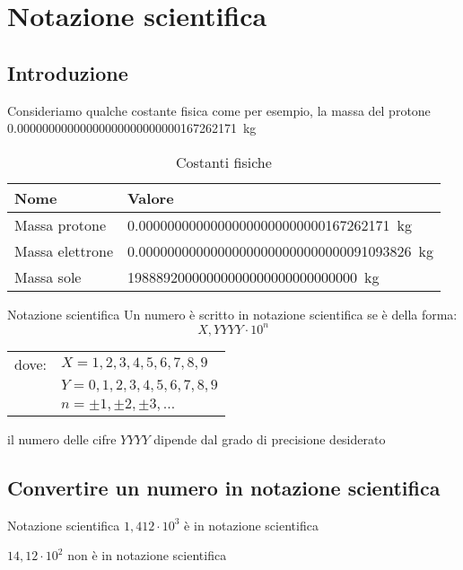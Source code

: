 \chapter{Notazione scientifica}
\section{Introduzione}
Consideriamo qualche costante fisica come per esempio, la massa del protone \SI{0,00000000000000000000000000167262171}{\kilogram}
\begin{table}
	\centering
	\begin{tabular}{ll}
		\toprule
		Nome&Valore\\
		\midrule
	Massa protone&\SI{0,00000000000000000000000000167262171}{\kilogram}\\
	Massa elettrone&\SI{0,00000000000000000000000000000091093826}{\kilogram}\\
	Massa sole&\SI{19888920000000000000000000000000}{\kilogram}\\
		\bottomrule
	\end{tabular}
\caption{Costanti fisiche}
\label{tab:costantifisiche1}
\end{table}
\label{cha:NotazioneScientifica}
\begin{definizionet}{Notazione scientifica}{}
Un numero è scritto in notazione scientifica se è della forma:
\[X,YYYY \cdot 10^n \]
\begin{tabular}{ll}
dove:&    $X=1,2,3,4,5,6,7,8,9$  \\ 
	    &     $ Y=0,1,2,3,4,5,6,7,8,9$ \\ 
	   &  $n=\pm 1, \pm 2,\pm 3,\ldots$\\
\end{tabular}
 
il numero delle cifre $YYYY$ dipende dal grado di precisione desiderato
\end{definizionet}
\section{Convertire un numero in notazione scientifica}
\begin{esempiot}{Notazione scientifica}{}
	$1,412\cdot 10^3$ è in notazione scientifica
	
	$14,12\cdot 10^2$ non è in notazione scientifica
\end{esempiot}